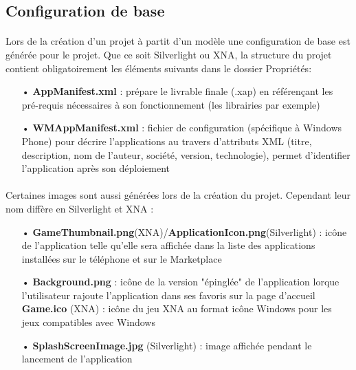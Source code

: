 \documentclass[twoside,UTF8]{EPURapport}
\begin{document}
		\subsection{Configuration de base}
\paragraph{}
Lors de la création d'un projet à partit d'un modèle une configuration de base est générée pour le projet. Que ce soit Silverlight ou XNA, la structure du projet contient obligatoirement les éléments suivants dans le dossier Propriétés: 
\begin{itemize}
	\item[•]\textbf{AppManifest.xml} : prépare le livrable finale (.xap) en référençant les pré-requis nécessaires à son fonctionnement (les librairies par exemple)
	\item[•]\textbf{WMAppManifest.xml} : fichier de configuration (spécifique à Windows Phone) pour décrire l'applications au travers d'attributs XML (titre, description, nom de l'auteur, société, version, technologie), permet d'identifier l'application après son déploiement
\end{itemize}

\paragraph{}
Certaines images sont aussi générées lors de la création du projet. Cependant leur nom diffère en Silverlight et XNA : 
\begin{itemize}
	\item[•]\textbf{GameThumbnail.png}(XNA)/\textbf{ApplicationIcon.png}(Silverlight) : icône de l'application telle qu'elle sera affichée dans la liste des applications installées sur le téléphone et sur le Marketplace
	\item[•]\textbf{Background.png} : icône de la version "épinglée" de l'application lorque l'utilisateur rajoute l'application dans ses favoris sur la page d'accueil
	\textbf{Game.ico} (XNA) : icône du jeu XNA au format icône Windows pour les jeux compatibles avec Windows
	\item[•]\textbf{SplashScreenImage.jpg} (Silverlight) : image affichée pendant le lancement de l'application 
\end{itemize}
\end{document}
